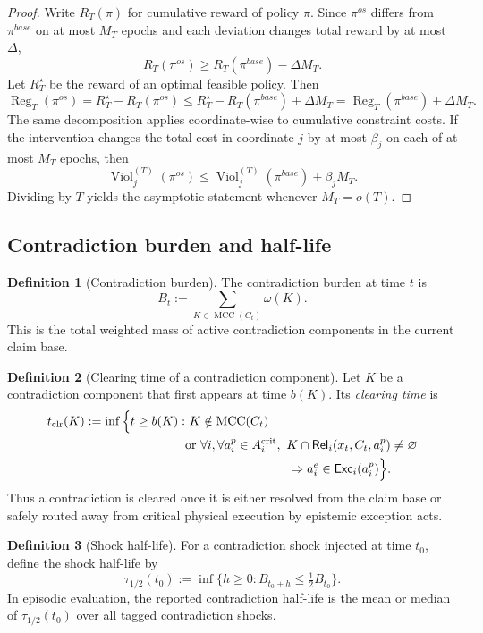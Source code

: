 \documentclass[11pt]{article}
\newcommand{\MCC}{\operatorname{MCC}}
\newcommand{\Reg}{\operatorname{Reg}}
\newcommand{\Viol}{\operatorname{Viol}}
\newcommand{\Exc}{\mathsf{Exc}}
\newcommand{\Rel}{\mathsf{Rel}}
\newcommand{\1}{\mathbf{1}}
\theoremstyle{definition}
\newtheorem{definition}{Definition}[section]
\theoremstyle{plain}
\theoremstyle{remark}
\begin{document}
\begin{proof}
Write $R_T(\pi)$ for cumulative reward of policy $\pi$. Since $\pi^{os}$ differs from $\pi^{base}$ on at most $M_T$ epochs and each deviation changes total reward by at most $\Delta$,
\[
R_T(\pi^{os})\ge R_T(\pi^{base})-\Delta M_T.
\]
Let $R_T^{\star}$ be the reward of an optimal feasible policy. Then
\[
\Reg_T(\pi^{os})
=
R_T^{\star}-R_T(\pi^{os})
\le
R_T^{\star}-R_T(\pi^{base})+\Delta M_T
=
\Reg_T(\pi^{base})+\Delta M_T.
\]
The same decomposition applies coordinate-wise to cumulative constraint costs. If the intervention changes the total cost in coordinate $j$ by at most $\beta_j$ on each of at most $M_T$ epochs, then
\[
\Viol_j^{(T)}(\pi^{os})
\le
\Viol_j^{(T)}(\pi^{base})+\beta_j M_T.
\]
Dividing by $T$ yields the asymptotic statement whenever $M_T=o(T)$.
\end{proof}


\subsection{Contradiction burden and half-life}

\begin{definition}[Contradiction burden]
\label{supp:def:contradiction-burden}
The contradiction burden at time $t$ is
\[
B_t:=\sum_{K\in \MCC(C_t)} \omega(K).
\]
This is the total weighted mass of active contradiction components in the current claim base.
\end{definition}

\begin{definition}[Clearing time of a contradiction component]
\label{supp:def:clearing-time}
Let $K$ be a contradiction component that first appears at time $b(K)$. Its \emph{clearing time} is
\[
\begin{aligned}
t_{\mathrm{clr}}(K)
:=
\inf\Big\{t\ge b(K):&\ K\notin \MCC(C_t) \\
&\text{or }\forall i,\forall a_i^p\in A_i^{\mathrm{crit}},\
K\cap \Rel_i(x_t,C_t,a_i^p)\neq\varnothing \\
&\hspace{8.2em}\Rightarrow a_i^e\in \Exc_i(a_i^p)
\Big\}.
\end{aligned}
\]
Thus a contradiction is cleared once it is either resolved from the claim base or safely routed away from critical physical execution by epistemic exception acts.
\end{definition}

\begin{definition}[Shock half-life]
\label{supp:def:half-life}
For a contradiction shock injected at time $t_0$, define the shock half-life by
\[
\tau_{1/2}(t_0)
:=
\inf\big\{h\ge 0 : B_{t_0+h}\le \tfrac{1}{2} B_{t_0}\big\}.
\]
In episodic evaluation, the reported contradiction half-life is the mean or median of $\tau_{1/2}(t_0)$ over all tagged contradiction shocks.
\end{definition}
\end{document}
